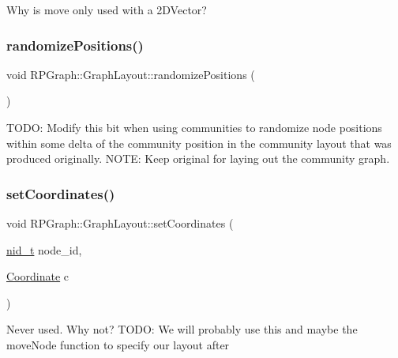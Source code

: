 Why is move only used with a 2\+D\+Vector? \mbox{\label{classRPGraph_1_1GraphLayout_a5d5912f46f1b6bf1bf1ee5850cbd818e}} 
\subsubsection{\texorpdfstring{randomize\+Positions()}{randomizePositions()}}
{\footnotesize\ttfamily void R\+P\+Graph\+::\+Graph\+Layout\+::randomize\+Positions (\begin{DoxyParamCaption}{ }\end{DoxyParamCaption})}

T\+O\+DO\+: Modify this bit when using communities to randomize node positions within some delta of the community position in the community layout that was produced originally. N\+O\+TE\+: Keep original for laying out the community graph.\mbox{\label{classRPGraph_1_1GraphLayout_a99ad68f3edff2c5f0a78a4db3e2f15ea}} 
\subsubsection{\texorpdfstring{set\+Coordinates()}{setCoordinates()}}
{\footnotesize\ttfamily void R\+P\+Graph\+::\+Graph\+Layout\+::set\+Coordinates (\begin{DoxyParamCaption}\item[{\mbox{\hyperlink{namespaceRPGraph_ab3ae34f1ab88e48f43794c30c8697b74}{nid\+\_\+t}}}]{node\+\_\+id,  }\item[{\mbox{\hyperlink{classRPGraph_1_1Coordinate}{Coordinate}}}]{c }\end{DoxyParamCaption})}

Never used. Why not? T\+O\+DO\+: We will probably use this and maybe the move\+Node function to specify our layout after \mbox{\label{classRPGraph_1_1GraphLayout_a870e6ad8d7e2dab189cb591dead19414}} 
